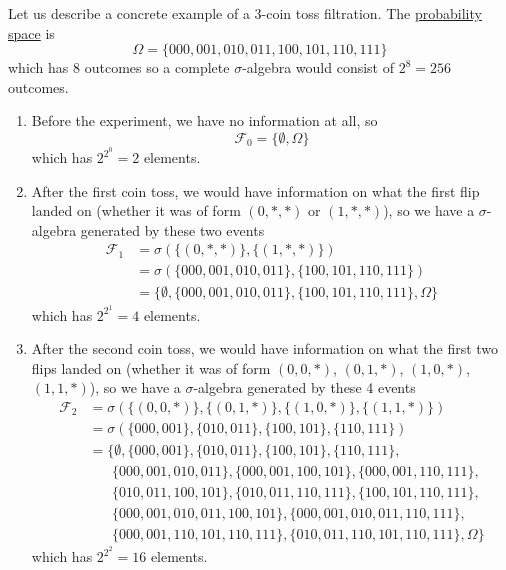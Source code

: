   \begin{example}
    \label{ex:filtration-of-3-coin-tosses}
    Let us describe a concrete example of a 3-coin toss filtration. The \hyperref[def:probability-space]{probability space} is 
    \begin{equation}
      \Omega = \{000, 001, 010, 011, 100, 101, 110, 111\}
    \end{equation}
    which has $8$ outcomes so a complete $\sigma$-algebra would consist of $2^8 = 256$ outcomes. 
    \begin{enumerate}
      \item Before the experiment, we have no information at all, so 
      \begin{equation}
        \mathcal{F}_0 = \{\emptyset, \Omega\}
      \end{equation}
      which has $2^{2^0} = 2$ elements. 
      
      \item After the first coin toss, we would have information on what the first flip landed on (whether it was of form $( 0, \ast, \ast)$ or $(1, \ast, \ast)$), so we have a $\sigma$-algebra generated by these two events 
      \begin{align*}
        \mathcal{F}_1 & = \sigma(\{( 0, \ast, \ast)\}, \{(1, \ast, \ast)\}) \\
        & = \sigma(\{000, 001, 010, 011\}, \{100, 101, 110, 111\}) \\
        & = \{\emptyset, \{000, 001, 010, 011\}, \{100, 101, 110, 111\}, \Omega\}
      \end{align*}
      which has $2^{2^1} = 4$ elements. 
      
      \item After the second coin toss, we would have information on what the first two flips landed on (whether it was of form $( 0, 0, \ast)$, $( 0, 1, \ast)$, $(1, 0, \ast)$, $(1, 1, \ast)$), so we have a $\sigma$-algebra generated by these 4 events 
      \begin{align}
        \mathcal{F}_2 & = \sigma(\{( 0, 0, \ast)\}, \{( 0, 1, \ast)\}, \{(1, 0, \ast)\}, \{(1, 1, \ast)\}) \\
        & = \sigma(\{000, 001\}, \{010, 011\}, \{100, 101\}, \{110, 111\}) \\
        & = \{\emptyset, \{000, 001\}, \{010, 011\}, \{100, 101\}, \{110, 111\}, \\
        & \;\;\;\;\;\; \{000, 001, 010, 011\}, \{000, 001, 100, 101\}, \{000, 001, 110, 111\}, \\
        & \;\;\;\;\;\; \{010, 011, 100, 101\}, \{010, 011, 110, 111\}, \{100, 101, 110, 111\}, \\ 
        & \;\;\;\;\;\; \{000, 001, 010, 011, 100, 101\}, \{000, 001, 010, 011, 110, 111\}, \\
        & \;\;\;\;\;\; \{000, 001, 110, 101, 110, 111\}, \{010, 011, 110, 101, 110, 111\},  \Omega\}
      \end{align}
      which has $2^{2^2} = 16$ elements. 
      

\end{enumerate}
\end{example}
